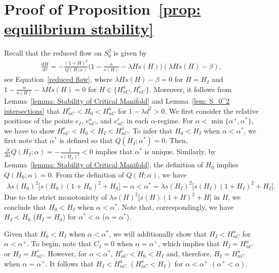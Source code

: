 \documentclass{article}
\theoremstyle{definition}
\numberwithin{equation}{section}
\begin{document}
\section{Proof of Proposition~\ref{prop: equilibrium stability}}
\label{sec: Stability of internal equilibrium}
Recall that the reduced flow on $S^2_0$ is given by 
\begin{align*}
    \frac{d H}{d \tau} = -\frac{(1+H)^2}{Q(H;\alpha)}\bigg(1-\frac{\alpha}{s(H)}-\lambda Hs(H)\bigg)(\lambda Hs(H)-\beta),
\end{align*}
see Equation~\eqref{reduced flow}, where $\lambda Hs(H)-\beta =0$ for $H=H_I$ and $1-\frac{\alpha}{s(H)}-\lambda Hs(H)=0$ for $H\in\big\{H_{nC}^a,H_{nC}^r\big\}$. Moreover, it follows from Lemma~\ref{lemma: Stability of Critical Manifold} and Lemma~\ref{lem: S_0^2 intersections} that $H_{nC}^r<H_0<H_{nC}^a$ for $1-\lambda d^2>0$.
We first consider the relative positions of the points $e_{I}$, $e_{nC}^a$, and $e_{nC}^r$ in each $\alpha$-regime.
For $\alpha<\min\{\alpha^+, \alpha^\ast\}$, we have to show $H_{nC}^r<H_0<H_I<H_{nC}^a$. To infer that $H_0<H_I$ when $\alpha<\alpha^\ast$, we first note that $\alpha^\ast$ is defined so that $Q(H_I;\alpha^\ast)=0$. Then, $\frac{\partial}{\partial \alpha}Q(H_I; \alpha)=-\frac{1}{s(H_I)^2}<0$ implies that $\alpha^{\ast}$ is unique.
Similarly, by Lemma~\ref{lemma: Stability of Critical Manifold}, the definition of $H_0$ implies $Q(H_0;\alpha)=0$. From the definition of $Q(H;\alpha)$, we have 
\begin{align*}
    \lambda s(H_0)^2 \big[s(H_0)(1+H_0)^2+H_0\big]=\alpha<\alpha^\ast=\lambda s(H_I)^2\big[s(H_I)(1+H_I)^2+H_I\big].
\end{align*}
Due to the strict monotonicity of $\lambda s(H)^2 \big[s(H)(1+H)^2+H\big]$ in $H$, we conclude that $H_0<H_I$ when $\alpha<\alpha^\ast$. Note that, correspondingly, we have $H_I<H_0$ ($H_I=H_0$) for $\alpha^\ast<\alpha$ ($\alpha=\alpha^\ast$).

Given that $H_0<H_I$ when $\alpha<\alpha^\ast$, we will additionally show that $H_I<H_{nC}^a$ for $\alpha<\alpha^+$. To begin, note that $C_I=0$ when $\alpha=\alpha^+$, which implies that $H_I=H_{nC}^a$ or $H_I=H_{nC}^r$. However, for $\alpha<\alpha^\ast$, $H_{nC}^r<H_0<H_I$ and, therefore, $H_I=H_{nC}^a$ when $\alpha=\alpha^+$. It follows that $H_I<H_{nC}^a$ $(H_{nC}^a<H_I)$ for $\alpha<\alpha^+$ $(\alpha^+<\alpha)$.
\end{document}
